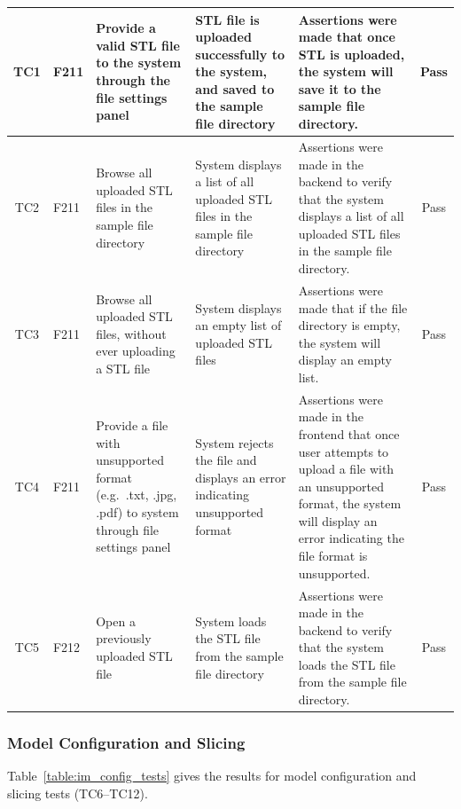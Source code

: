 \documentclass[12pt, titlepage]{article}
\begin{document}
\begin{longtable}{c
    >{\raggedright\arraybackslash}p{1cm}
    >{\raggedright\arraybackslash}p{2.5cm}
    >{\raggedright\arraybackslash}p{3.5cm}
  >{\raggedright\arraybackslash}p{5cm} c}
  TC1 & F211 & Provide a valid STL file to the system through the file settings panel & STL file is uploaded successfully to the system, and saved to the sample file directory & Assertions were made that once STL is uploaded, the system will save it to the sample file directory. & \cellcolor{green} Pass \\ \midrule
  TC2 & F211 & Browse all uploaded STL files in the sample file directory & System displays a list of all uploaded STL files in the sample file directory & Assertions were made in the backend to verify that the system displays a list of all uploaded STL files in the sample file directory. & \cellcolor{green} Pass \\ \midrule 
  TC3 & F211 & Browse all uploaded STL files, without ever uploading a STL file & System displays an empty list of uploaded STL files & Assertions were made that if the file directory is empty, the system will display an empty list. & \cellcolor{green} Pass \\ \midrule
  TC4 & F211 & Provide a file with unsupported format (e.g.\ .txt, .jpg, .pdf) to system through file settings panel & System rejects the file and displays an error indicating unsupported format & Assertions were made in the frontend that once user attempts to upload a file with an unsupported format, the system will display an error indicating the file format is unsupported. & \cellcolor{green} Pass \\ \midrule
  TC5 & F212 & Open a previously uploaded STL file & System loads the STL file from the sample file directory & Assertions were made in the backend to verify that the system loads the STL file from the sample file directory. & \cellcolor{green} Pass \\
\end{longtable}

\subsubsection{Model Configuration and Slicing}
Table~\ref{table:im_config_tests} gives the results for model configuration and slicing tests (TC6--TC12).
\end{document}
